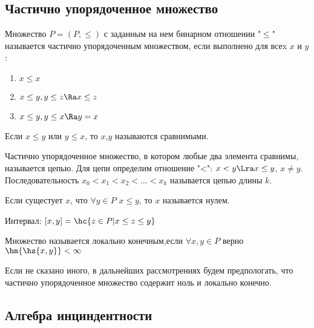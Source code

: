 \documentclass[unicode, 10pt, a4paper, oneside, fleqn]{article}
\begin{document}
\subsection{Частично упорядоченное множество}
\begin{df}
  Множество $P=(P,\le)$ с заданным на нем бинарном отношении "$\le$" называется частично 
  упорядоченным множеством, если выполнено для всеx $x$ и $y$:
  \begin{enumerate}
    \item $\displaystyle x\le x$
    \item $x\le y, y\le z \Ra x\le z$
    \item $x\le y, y\le x \Ra y=x$
  \end{enumerate}
\end{df}
\begin{df}
  Если $x\le y$ или $y\le x$, то $x$,$y$ называются сравнимыми.
\end{df}
\begin{df}
  Частично упорядоченное множество, в котором любые два элемента сравнимы, называется цепью.
  Для цепи определим отношение "<": $x<y \Lra x\le y$, $x\neq y$.
  Последовательность $\displaystyle x_0 < x_1 < x_2 < \dots <x_k$ называется цепью длины $k$.
\end{df}
\begin{df}
  Если сущестует $x$, что $\forall y\in P$ $x\le y$, то $x$ называется нулем.
\end{df}
\begin{df}
  Интервал: $[x,y] = \hc{z\in P | x\le z\le y}$
\end{df}
\begin{df}
  Множество называется локально конечным,\linebreak  если $\forall x,y\in P$ верно $\hm{\hs{x,y}}<\infty$
\end{df}
\begin{note}
Если не сказано иного, в дальнейших рассмотрениях будем предпологать, 
что частично упорядоченное множество содержит ноль и локально конечно.
\end{note}
\subsection{Алгебра инциндентности}
\end{document}
